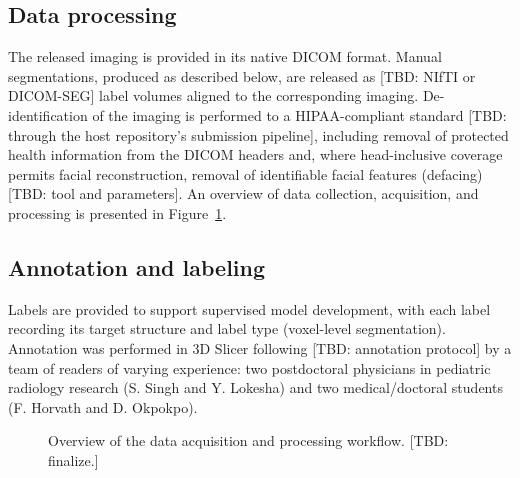 \subsection*{Data processing}\label{subsec:curation}
The released imaging is provided in its native DICOM format.
Manual segmentations, produced as described below, are released as [TBD: NIfTI or DICOM-SEG] label volumes aligned to the corresponding imaging.
De-identification of the imaging is performed to a HIPAA-compliant standard [TBD: through the host repository's submission pipeline], including removal of protected health information from the DICOM headers and, where head-inclusive coverage permits facial reconstruction, removal of identifiable facial features (defacing) [TBD: tool and parameters].
An overview of data collection, acquisition, and processing is presented in Figure~\ref{fig:workflow}.

\subsection*{Annotation and labeling}\label{subsec:annotation}
Labels are provided to support supervised model development, with each label recording its target structure and label type (voxel-level segmentation).
Annotation was performed in 3D Slicer following [TBD: annotation protocol] by a team of readers of varying experience: two postdoctoral physicians in pediatric radiology research (S. Singh and Y. Lokesha) and two medical/doctoral students (F. Horvath and D. Okpokpo).

\begin{figure}[t]
\centering
{}
\caption{Overview of the data acquisition and processing workflow. [TBD: finalize.]}
\label{fig:workflow}
\end{figure}
